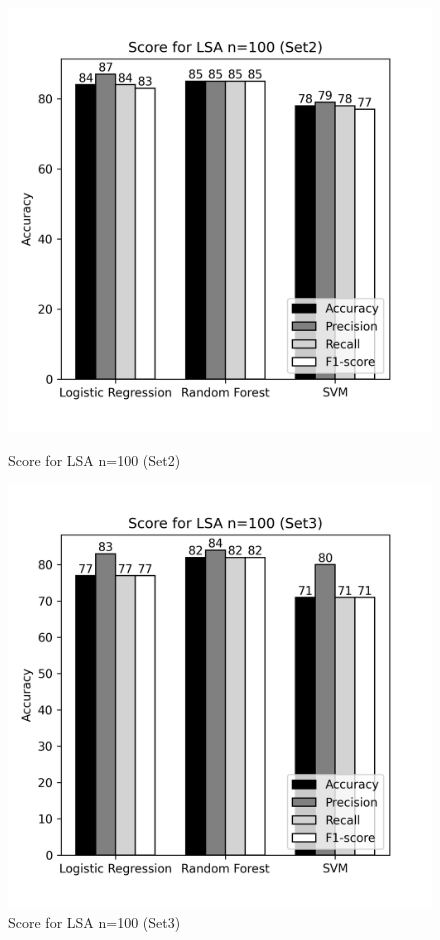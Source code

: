 \documentclass[12pt]{report}
\begin{document}
             \begin{figure}[h]
                \begin{minipage}{0.48\textwidth}
                  \centering
                  \includegraphics[scale=0.55]{plots/Score for LSA n=100 (Set2).png}
                  \caption{Score for LSA n=100 (Set2)}\label{Fig:typo1}
                \end{minipage}\hfill
                \begin{minipage}{0.48\textwidth}
                  \centering
                  \includegraphics[scale=0.55]{plots/Score for LSA n=100 (Set3).png}
                  \caption{Score for LSA n=100 (Set3)}\label{Fig:typo2}
                \end{minipage}
             \end{figure}
\end{document}
